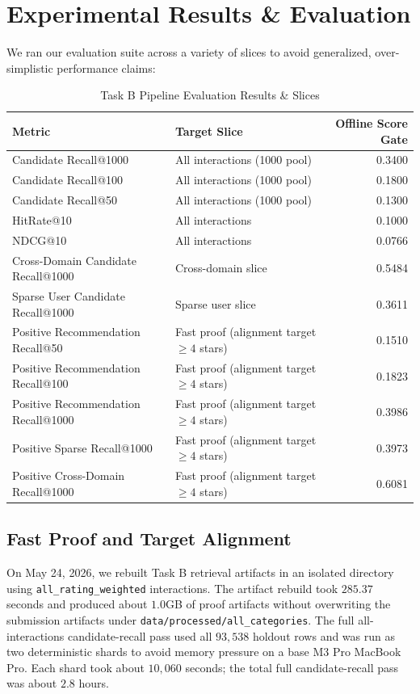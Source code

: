 \documentclass[11pt,a4paper]{article}
\begin{document}
\section{Experimental Results \& Evaluation}
We ran our evaluation suite across a variety of slices to avoid generalized, over-simplistic performance claims:

\begin{table}[h]
\centering
\caption{Task B Pipeline Evaluation Results & Slices}
\begin{tabular}{llr}
\toprule
\textbf{Metric} & \textbf{Target Slice} & \textbf{Offline Score Gate} \\
\midrule
Candidate Recall@1000 & All interactions (1000 pool) & 0.3400 \\
Candidate Recall@100 & All interactions (1000 pool) & 0.1800 \\
Candidate Recall@50 & All interactions (1000 pool) & 0.1300 \\
HitRate@10 & All interactions & 0.1000 \\
NDCG@10 & All interactions & 0.0766 \\
Cross-Domain Candidate Recall@1000 & Cross-domain slice & 0.5484 \\
Sparse User Candidate Recall@1000 & Sparse user slice & 0.3611 \\
Positive Recommendation Recall@50 & Fast proof (alignment target $\ge 4$ stars) & 0.1510 \\
Positive Recommendation Recall@100 & Fast proof (alignment target $\ge 4$ stars) & 0.1823 \\
Positive Recommendation Recall@1000 & Fast proof (alignment target $\ge 4$ stars) & 0.3986 \\
Positive Sparse Recall@1000 & Fast proof (alignment target $\ge 4$ stars) & 0.3973 \\
Positive Cross-Domain Recall@1000 & Fast proof (alignment target $\ge 4$ stars) & 0.6081 \\
\bottomrule
\end{tabular}
\end{table}

\subsection{Fast Proof and Target Alignment}
On May 24, 2026, we rebuilt Task B retrieval artifacts in an isolated directory using \texttt{all\_rating\_weighted} interactions. The artifact rebuild took $285.37$ seconds and produced about $1.0$GB of proof artifacts without overwriting the submission artifacts under \texttt{data/processed/all\_categories}. The full all-interactions candidate-recall pass used all $93{,}538$ holdout rows and was run as two deterministic shards to avoid memory pressure on a base M3 Pro MacBook Pro. Each shard took about $10{,}060$ seconds; the total full candidate-recall pass was about $2.8$ hours.
\end{document}
